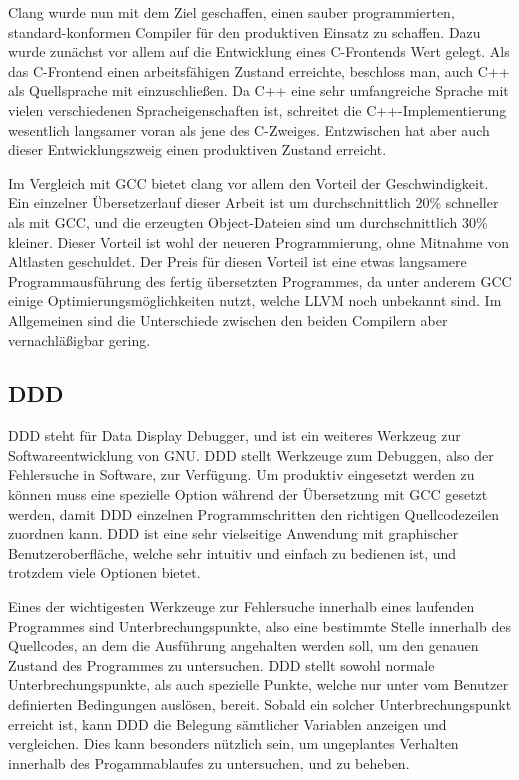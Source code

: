 Clang wurde nun mit dem Ziel geschaffen, einen sauber programmierten, standard-konformen Compiler für den produktiven Einsatz zu schaffen. Dazu wurde zunächst vor allem auf die Entwicklung eines C-Frontends
Wert gelegt. Als das C-Frontend einen arbeitsfähigen Zustand erreichte, beschloss man, auch C++ als Quellsprache mit einzuschließen. Da C++ eine sehr umfangreiche Sprache mit vielen verschiedenen Spracheigenschaften 
ist, schreitet die C++-Implementierung wesentlich langsamer voran als jene des C-Zweiges. Entzwischen hat aber auch dieser Entwicklungszweig einen produktiven Zustand erreicht. 

Im Vergleich mit GCC bietet clang vor allem den Vorteil der Geschwindigkeit. Ein einzelner Übersetzerlauf dieser Arbeit ist um durchschnittlich 20\% schneller als mit GCC, und die erzeugten Object-Dateien
sind um durchschnittlich 30\% kleiner. Dieser Vorteil ist wohl der neueren Programmierung, ohne Mitnahme von Altlasten geschuldet. Der Preis für diesen Vorteil ist eine etwas langsamere Programmausführung
des fertig übersetzten Programmes, da unter anderem GCC einige Optimierungsmöglichkeiten nutzt, welche LLVM noch unbekannt sind. Im Allgemeinen sind die Unterschiede zwischen den beiden Compilern aber
vernachläßigbar gering.

\subsection{DDD}
DDD steht für Data Display Debugger, und ist ein weiteres Werkzeug zur Softwareentwicklung von GNU. DDD stellt Werkzeuge zum Debuggen, also der Fehlersuche in Software, zur Verfügung. Um produktiv eingesetzt
werden zu können muss eine spezielle Option während der Übersetzung mit GCC gesetzt werden, damit DDD einzelnen Programmschritten den richtigen Quellcodezeilen zuordnen kann. DDD ist eine sehr vielseitige
Anwendung mit graphischer Benutzeroberfläche, welche sehr intuitiv und einfach zu bedienen ist, und trotzdem viele Optionen bietet.

Eines der wichtigesten Werkzeuge zur Fehlersuche innerhalb eines laufenden Programmes sind Unterbrechungspunkte, also eine bestimmte Stelle innerhalb des Quellcodes, an dem die Ausführung angehalten werden 
soll, um den genauen Zustand des Programmes zu untersuchen. DDD stellt sowohl normale Unterbrechungspunkte, als auch spezielle Punkte, welche nur unter vom Benutzer definierten Bedingungen auslösen, bereit.
Sobald ein solcher Unterbrechungspunkt erreicht ist, kann DDD die Belegung sämtlicher Variablen anzeigen und vergleichen. Dies kann besonders nützlich sein, um ungeplantes Verhalten innerhalb des
Progamm\-ablaufes zu untersuchen, und zu beheben. 

